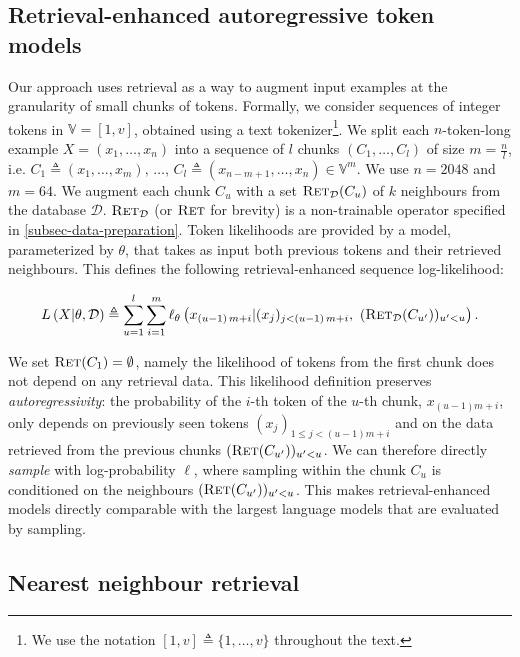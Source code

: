 \subsection{Retrieval-enhanced autoregressive token models}\label{subsec:probabilistic-model}
Our approach uses retrieval as a way to augment input examples at the granularity of small chunks of tokens. Formally, we consider sequences of integer tokens in $\mathbb{V} = [1, v]$, obtained using a text tokenizer\footnote{We use the notation $[1, v] \triangleq \{1, \dots, v \}$ throughout the text.}. We split each $n$-token-long example $X = (x_1, \dots, x_n)$ into a sequence of $l$ chunks $(C_1, \dots, C_l)$  of size $m=\frac{n}{l}$, i.e. $C_1  \triangleq {(x_1, \dots, x_m),\, \dots ,\, C_{l} \triangleq} (x_{n - m + 1}, \dots, x_n)  \in \mathbb{V}^{m}$. We use $n=2048$ and $m=64$. We augment each chunk $C_u$ with a set $\textsc{Ret}_\mathcal{D}(C_u)$ of $k$ neighbours from the database $\mathcal{D}$. 
$\textsc{Ret}_\mathcal{D}$ (or $\textsc{Ret}$ for brevity) is a non-trainable operator specified in \autoref{subsec-data-preparation}. 
Token likelihoods are provided by a model, parameterized by $\theta$, that takes as input both previous tokens and their retrieved neighbours. This defines the following retrieval-enhanced sequence log-likelihood:

\begin{equation}\label{eq:likelihood}
    L\left(X |\theta, \mathcal{D} \right)
    \triangleq \sum_{u=1}^{l} \sum_{i=1}^{m} \ell_\theta \left (x_{(u-1)\,m + i} | (x_j)_{j < (u-1)\,m + i},\ (\textsc{Ret}_\mathcal{D}(C_{u'}))_{u' < u} \right).
\end{equation}

We set $\textsc{Ret}(C_1) = \emptyset$, namely the likelihood of tokens from the first chunk does not depend on any retrieval data. This likelihood definition preserves \textit{autoregressivity}: the probability of the $i$-th token of the $u$-th chunk, $x_{(u-1) m + i}$, only depends on previously seen tokens $(x_j)_{1 \leqslant j < (u-1)m + i}$ and on the data retrieved from the previous chunks
$(\textsc{Ret}(C_{u'}))_{u'<u}$. 
We can therefore directly \textit{sample} with log-probability $\ell$, where sampling within the chunk $C_u$ is conditioned on the neighbours $(\textsc{Ret}(C_{u'}))_{u'<u}$. 
This makes retrieval-enhanced models directly comparable with the largest language models that are evaluated by sampling.

\subsection{Nearest neighbour retrieval}
\label{subsec-data-preparation}

